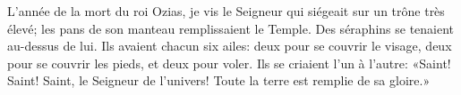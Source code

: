 L’année de la mort du roi Ozias, je vis le Seigneur qui siégeait sur un trône très élevé;
	les pans de son manteau remplissaient le Temple.
Des séraphins se tenaient au-dessus de lui.
	Ils avaient chacun six ailes:
	deux pour se couvrir le visage, deux pour se couvrir les pieds,
	et deux pour voler.
Ils se criaient l’un à l’autre:
	«Saint! Saint! Saint, le Seigneur de l’univers!
	Toute la terre est remplie de sa gloire.»
